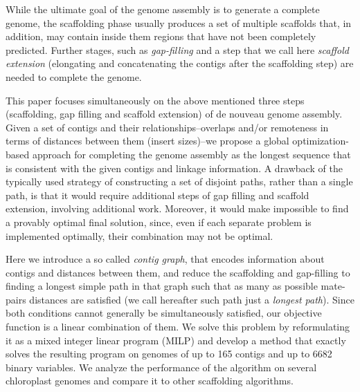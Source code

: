 While the ultimate goal of the genome assembly is to generate a complete genome, the scaffolding phase usually produces a set of multiple scaffolds that, in addition, may contain inside them regions that have not been completely predicted. %
Further stages, such as  \textit{gap-filling} and  a step that we call here  \textit{scaffold extension} (elongating and concatenating the contigs after  the scaffolding step) are needed  to complete the genome. %

This paper focuses simultaneously on the above mentioned three  steps (scaffolding, gap filling and scaffold extension)  of de nouveau genome assembly.  Given a set of contigs and their relationships--overlaps and/or remoteness  in terms of distances between them (insert sizes)--we propose a global  optimization-based approach for completing  the genome assembly as the longest sequence that is consistent with the given contigs and linkage information. 
A drawback of the typically used strategy of constructing a set of disjoint paths, rather than a single path, is that it would require additional steps of gap filling and scaffold extension, involving additional work. Moreover, it would make impossible to find a provably optimal  final solution, since, even if each separate problem is implemented optimally, their combination may not be optimal.


Here we introduce a so called   \textit{contig graph}, that encodes information about contigs and distances between them,
and reduce the  scaffolding and gap-filling  to finding a longest simple path in that graph such that as many as possible mate-pairs distances are satisfied  (we call hereafter such path just a \textit{longest path}).  Since both conditions cannot generally be simultaneously satisfied, our objective function is a linear combination of them.  We solve this problem by reformulating it as a mixed integer linear program (MILP) and develop a method that  exactly solves the resulting program on genomes of up to 165 contigs and up to 6682  binary variables. We analyze the performance of the algorithm on several chloroplast genomes and compare it to other scaffolding algorithms. 


